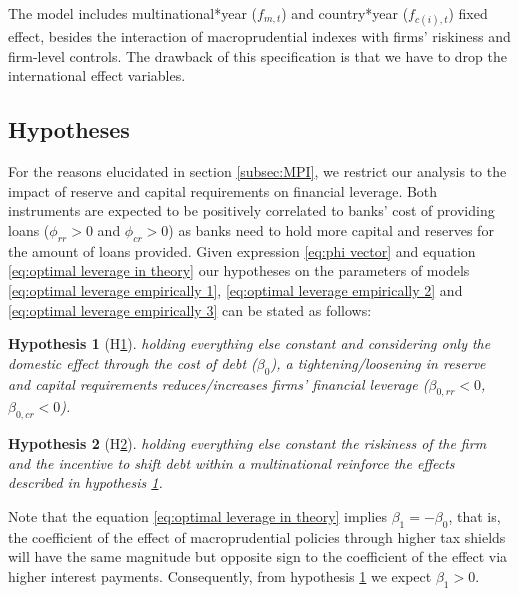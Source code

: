 \documentclass[12pt]{article}
\newtheorem{hyp}{Hypothesis}
\begin{document}
	The model includes multinational*year ($f_{m,t}$) and country*year ($f_{c(i),t}$) fixed effect, besides the interaction of macroprudential indexes with firms' riskiness and firm-level controls. The drawback of this specification is that we have to drop the international effect variables. 		
	
		\subsection{Hypotheses}
	\label{subsec:hypothesis} 
	 For the reasons elucidated in section \ref{subsec:MPI}, we restrict our analysis to the impact of reserve and capital requirements on financial leverage. Both instruments are expected to be positively correlated to banks' cost of providing loans ($\phi_{rr}>0$ and $\phi_{cr}>0$) as banks need to hold more capital and reserves for the amount of loans provided. Given expression \ref{eq:phi vector} and equation 	\ref{eq:optimal leverage in theory} our hypotheses on the parameters of models \ref{eq:optimal leverage empirically 1}, \ref{eq:optimal leverage empirically 2} and \ref{eq:optimal leverage empirically 3} can be stated as follows:

	\begin{hyp}[H\ref{hyp:H1}] \label{hyp:H1}
		holding everything else constant and considering only the domestic effect through the cost of debt ($\beta_{0}$), a tightening/loosening in reserve and capital requirements reduces/increases firms' financial leverage ($\beta_{0,rr}<0$, $\beta_{0,cr}<0$).
	\end{hyp}
	\begin{hyp}[H\ref{hyp:H2}] \label{hyp:H2}
		holding everything else constant the riskiness of the firm and the incentive to shift debt within a multinational reinforce the effects described in hypothesis \ref{hyp:H1}. 
	\end{hyp}
Note that the equation \ref{eq:optimal leverage in theory} implies $\beta_{1}=-\beta_{0}$, that is, the coefficient of the effect of macroprudential policies through higher tax shields will have the same magnitude but opposite sign to the coefficient of the effect via higher interest payments. Consequently, from hypothesis \ref{hyp:H1} we expect $\beta_{1}>0$. 
	 
\end{document}
